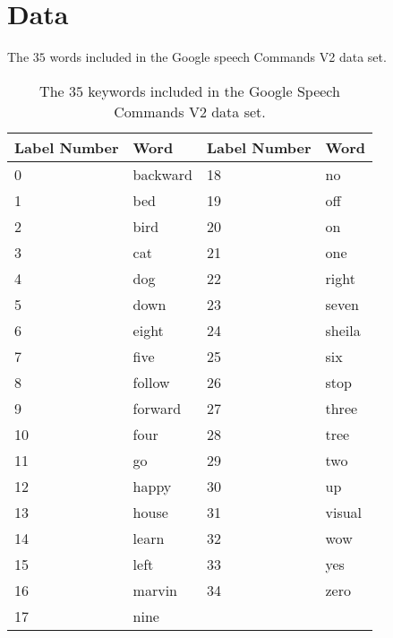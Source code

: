 \chapter{Data} \label{Appendix:constraints}
The \(35\) words included in the Google speech Commands V2 data set.

\begin{table}[ht]
    \centering
    \begin{tabular}{@{}llll@{}}
        \toprule
        Label Number & Word & Label Number & Word\\ \midrule
        0  &  backward & 18  &  no  \\
        1  &  bed & 19  &  off  \\
        2  &  bird & 20  &  on  \\
        3  &  cat & 21  &  one  \\
        4  &  dog & 22  &  right  \\
        5  &  down & 23  &  seven  \\
        6  &  eight & 24  &  sheila  \\
        7  &  five & 25  &  six  \\
        8  &  follow & 26  &  stop  \\
        9  &  forward & 27  &  three  \\
        10  &  four & 28  &  tree  \\
        11  &  go & 29  &  two  \\
        12  &  happy & 30  &  up  \\
        13  &  house & 31  &  visual  \\
        14  &  learn & 32  &  wow  \\
        15  &  left & 33  &  yes  \\
        16  &  marvin & 34  &  zero  \\
        17  &  nine \\
        \bottomrule
    \end{tabular}
    \caption{The \(35\) keywords included in the Google Speech Commands V2 data set.}
    \label{tab:google_words}
\end{table}
